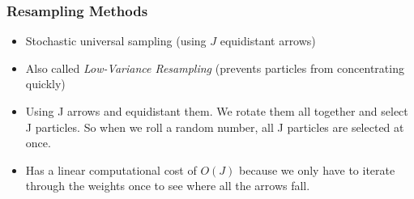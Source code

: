 \begin{frame}
    \frametitle{Resampling Methods}

    \footnotesize


    \begin{itemize}
        \item Stochastic universal sampling (using $J$ equidistant arrows)
        \item Also called \emph{Low-Variance Resampling} (prevents particles from concentrating quickly)
        \item Using J arrows and equidistant them. We rotate them all together and select J particles. So when we roll a random number, all J particles are selected at once.
        \item Has a linear computational cost of $O(J)$ because we only have to iterate through the weights once to see where all the arrows fall.
    \end{itemize}

\end{frame}

